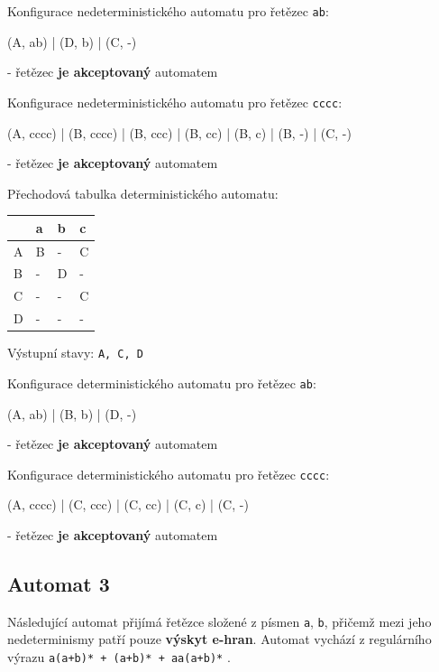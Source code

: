 \documentclass[11pt]{article}
\begin{document}
\bigskip

Konfigurace nedeterministického automatu pro řetězec \texttt{ab}:

(A, ab) | (D, b) | (C, -)

- řetězec \textbf{je akceptovaný} automatem

\bigskip

Konfigurace nedeterministického automatu pro řetězec \texttt{cccc}:

(A, cccc) | (B, cccc) | (B, ccc) | (B, cc) | (B, c) | (B, -) | (C, -)

- řetězec \textbf{je akceptovaný} automatem

\bigskip

Přechodová tabulka deterministického automatu:

\bigskip

\begin{tabular}{| l | l | l | l |}
\hline
  & a & b & c \\ \hline
A & B & - & C \\ \hline
B & - & D & - \\ \hline
C & - & - & C \\ \hline
D & - & - & - \\
\hline
\end{tabular}

\bigskip

Výstupní stavy: \texttt{A, C, D}

\bigskip

Konfigurace deterministického automatu pro řetězec \texttt{ab}:

(A, ab) | (B, b) | (D, -)

- řetězec \textbf{je akceptovaný} automatem

\bigskip

Konfigurace deterministického automatu pro řetězec \texttt{cccc}:

(A, cccc) | (C, ccc) | (C, cc) | (C, c) | (C, -)

- řetězec \textbf{je akceptovaný} automatem

\newpage

\subsection{Automat 3}
Následující automat přijímá řetězce složené z písmen \texttt{a}, \texttt{b}, přičemž mezi jeho nedeterminismy patří pouze \textbf{výskyt e-hran}. Automat vychází z regulárního výrazu \texttt{a(a+b)* + (a+b)* + aa(a+b)*} .
\end{document}
